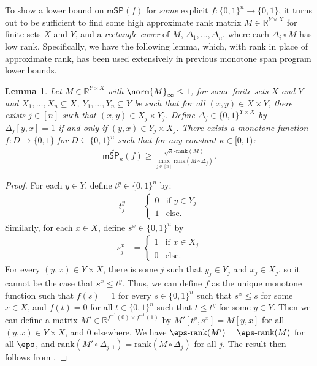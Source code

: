\documentclass[11pt]{article}
\numberwithin{equation}{section}
\newtheorem{lemma}[theorem]{Lemma}
\theoremstyle{definition}
\theoremstyle{plain}
\newcommand{\R}{\mathbb R}
\begin{document}
To show a lower bound on $\mathsf{m}\widetilde{\mathsf{SP}}(f)$ for \emph{some} explicit $f:\{0,1\}^n\rightarrow\{0,1\}$, it turns out to be sufficient to find some high approximate rank matrix $M\in\R^{Y\times X}$ for finite sets $X$ and $Y$, and a \emph{rectangle cover} of $M$, $\Delta_1,\dots,\Delta_n$, where each $\Delta_i\circ M$ has low rank. 
Specifically, we have the following lemma, which, with rank in place of approximate rank, has been used extensively in previous monotone span program lower bounds. 

\begin{lemma}\label{lem:matrix-to-f}
Let $M\in\R^{Y\times X}$ with $\norm{M}_\infty\leq 1$, for some finite sets $X$ and $Y$ and $X_1,\dots,X_n\subseteq X$, $Y_1,\dots, Y_n\subseteq Y$ be such that for all $(x,y)\in X\times Y$, there exists $j\in [n]$ such that $(x,y)\in X_j\times Y_j$. Define $\Delta_j\in\{0,1\}^{Y\times X}$ by $\Delta_j[y,x]=1$ if and only if $(y,x)\in Y_j\times X_j$. There exists a monotone function $f:D\rightarrow\{0,1\}$ for $D\subseteq\{0,1\}^n$ such that for any constant $\kappa\in [0,1)$:
\begin{align*}
\mathsf{m}\widetilde{\mathsf{SP}}_\kappa(f)\geq \frac{\sqrt{\kappa}\mbox{-}\mathrm{rank}(M)}{\max_{j\in [n]}\mathrm{rank}(M\circ\Delta_j)}.
\end{align*}
\end{lemma}
\begin{proof}
For each $y\in Y$, define $t^y\in\{0,1\}^n$ by:
\begin{align*}
t^y_j &=\left\{\begin{array}{ll}
0 & \mbox{if }y\in Y_j\\
1 & \mbox{else.}
\end{array}\right.
\end{align*}
Similarly, for each $x\in X$, define $s^x\in\{0,1\}^n$ 
by %
\begin{align*}
s^x_j &=\left\{\begin{array}{ll}
1 & \mbox{if }x\in X_j\\
0 & \mbox{else.}
\end{array}\right.
\end{align*}
For every $(y,x)\in Y\times X$, there is some $j$ such that $y_j\in Y_j$ and $x_j\in X_j$, so it %
cannot  %
be the case that $s^x\leq t^y$. Thus, we can define $f$ as the unique monotone function such that $f(s)=1$ for every $s\in\{0,1\}^n$ such that $s^x\leq s$ for some $x\in X$, and $f(t)=0$ for all $t\in\{0,1\}^n$ such that $t\leq t^y$ for some $y\in Y$. Then we can define a matrix $M'\in\R^{f^{-1}(0)\times f^{-1}(1)}$ by $M'[t^y,s^x]=M[y,x]$ for all $(y,x)\in Y\times X$, and 0 elsewhere. We have $\eps\mbox{-rank}(M')=\eps\mbox{-rank}(M)$ for all $\eps$, and $\mathrm{rank}(M'\circ\Delta_{j,1})=\mathrm{rank}(M\circ\Delta_j)$ for all $j$. The result then follows from .
\end{proof}
\end{document}
